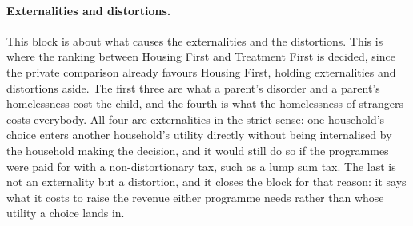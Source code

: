 \documentclass[10pt]{article}
\begin{document}
\paragraph{Externalities and distortions.} This block is about what causes the
externalities and the distortions. This is where the ranking between Housing
First and Treatment First is decided, since the private comparison already favours
Housing First, holding externalities and distortions aside.
The first three are what a parent's disorder and a
parent's homelessness cost the child, and the fourth is what the
homelessness of strangers costs everybody. All four are externalities in the strict
sense: one household's choice enters another household's utility directly without
being internalised by the household making the decision, and it
would still do so if the programmes were paid for with a non-distortionary tax, such
as a lump sum tax. The
last is not an externality but a distortion, and it closes the block for that
reason: it says what it costs to raise the revenue either programme needs rather
than whose utility a choice lands in.
\end{document}
